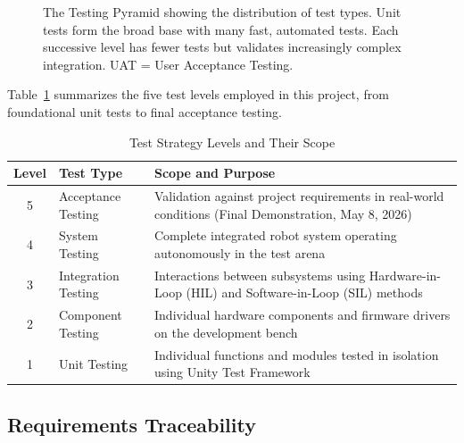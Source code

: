 \begin{figure}[H]
    \caption{The Testing Pyramid showing the distribution of test types. Unit tests form the broad base with many fast, automated tests. Each successive level has fewer tests but validates increasingly complex integration. UAT = User Acceptance Testing.}
    \label{fig:test_pyramid}
\end{figure}

Table~\ref{tab:test_strategy} summarizes the five test levels employed in this project, from foundational unit tests to final acceptance testing.

\begin{table}[H]
    \centering
    \caption{Test Strategy Levels and Their Scope}
    \label{tab:test_strategy}
    \begin{tabular}{@{}clp{7cm}@{}}
        \toprule
        \textbf{Level} & \textbf{Test Type} & \textbf{Scope and Purpose} \\
        \midrule
        5 & Acceptance Testing & Validation against project requirements in real-world conditions (Final Demonstration, May 8, 2026) \\
        4 & System Testing & Complete integrated robot system operating autonomously in the test arena \\
        3 & Integration Testing & Interactions between subsystems using Hardware-in-Loop (HIL) and Software-in-Loop (SIL) methods \\
        2 & Component Testing & Individual hardware components and firmware drivers on the development bench \\
        1 & Unit Testing & Individual functions and modules tested in isolation using Unity Test Framework \\
        \bottomrule
    \end{tabular}
\end{table}

\subsection{Requirements Traceability}

